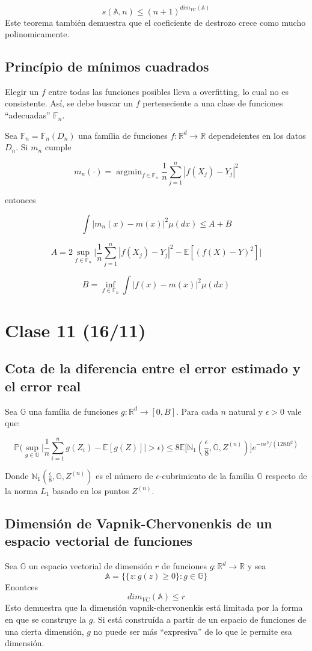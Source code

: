 \documentclass[12pt, a4paper]{article}
\begin{document}
$$
s(\mathds{A},n)\leq(n+1)^{dim_{VC}(\mathds{A})}
$$
Este teorema también demuestra que el coeficiente de destrozo crece como mucho polinomicamente.

\subsection{Princípio de mínimos cuadrados}
Elegir un $f$ entre todas las funciones posibles lleva a overfitting, lo cual no es consistente. Así, se debe buscar un $f$ perteneciente a una clase de funciones ``adecuadas'' $\mathds{F}_n$.

Sea $\mathds{F}_n=\mathds{F}_n(D_n)$ una família de funciones $f:\mathds{R}^d \rightarrow \mathds{R}$ dependeientes en los datos $D_n$. Si $m_n$ cumple

$$
m_n(\cdot) = \mathop{argmin}_{f\in\mathds{F}_n} \frac{1}{n} \sum_{j=1}^n | f(X_j) - Y_j |^2
$$

entonces

$$
\int |m_n(x) - m(x)|^2 \mu(dx) \leq A + B
$$

$$
A=2 \mathop{sup}_{f\in\mathds{F}_n} \Big| \frac{1}{n} \sum_{j=1}^n |f(X_j)-Y_j|^2 -\mathds{E}[ (f(X)-Y)^2 ] \Big|
$$

$$
B=\mathop{inf}_{f\in\mathds{F}_n} \int | f(x)-m(x) |^2 \mu(dx)
$$

\section{Clase 11 (16/11)}
\subsection{Cota de la diferencia entre el error estimado y el error real}
Sea $\mathds{G}$ una família de funciones $g:\mathds{R}^d\rightarrow [0,B]$. Para cada $n$ natural y $\epsilon>0$ vale que:

$$
\mathds{P}\Bigg( \mathop{sup}_{g\in\mathds{G}} \big| \frac{1}{n} \sum_{i=1}^n g(Z_i) - \mathds{E}[g(Z)] \big| >\epsilon \Bigg)
\leq
8\mathds{E}\Bigg[ \mathds{N}_1(\frac{\epsilon}{8},\mathds{G},Z^{(n)}) \Bigg] e^{-n\epsilon^2/(128B^2)}
$$

Donde $ \mathds{N}_1(\frac{\epsilon}{8},\mathds{G},Z^{(n)}) $ es el número de $\epsilon$-cubrimiento de la família $\mathds{G}$ respecto de la norma $L_1$ basado en los puntos $Z^{(n)}$.
\subsection{Dimensión de Vapnik-Chervonenkis de un espacio vectorial de funciones}
Sea $\mathds{G}$ un espacio vectorial de dimensión $r$  de funciones $g:\mathds{R}^d\rightarrow\mathds{R}$ y sea $$\mathds{A}=\Big\{ \{ z:g(z)\geq 0 \} : g\in\mathds{G}\Big\}$$
Enontces $$dim_{VC}(\mathds{A})\leq r$$
Esto demuestra que la dimensión vapnik-chervonenkis está limitada por la forma en que se construye la $g$. Si está construída a partir de un espacio de funciones de una cierta dimensión, $g$ no puede ser más ``expresiva'' de lo que le permite esa dimensión.
\end{document}
